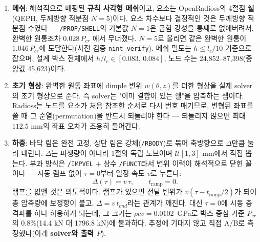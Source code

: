 \documentclass[11pt]{article}
\begin{document}
\begin{enumerate}
      한 가지는 분명히 해둔다: \textbf{항복 곡면이 없다}(\texttt{/MAT/ELAST}).
      설계 박스에서 고전 좌굴응력 $\sigma_{cr} = 0.60523\,Et/R$은
      $0.64$--$2.54$~GPa이므로, 실제 강재라면 좌굴하기 훨씬 전에 항복한다.
      즉 이 벤치마크는 "강재로 만든 캔"의 모델이 아니라 \emph{탄성 박막쉘
      모델문제}이고, 강재의 $E$와 $\rho$는 그 모델문제에 물리 단위를 주기 위한
      선택이다. 이는 고전 좌굴이론과 knockdown factor 문헌(NASA~SP-8007 등)이
      다루는 대상과 정확히 같은 설정이므로, 보고하는 $P_{\max}/P_{cr}$은 그
      문헌과 직접 비교 가능하다. 소성까지 포함한 좌굴은 별도의 문제이며 이
      데이터셋의 범위가 아니다.
\item \textbf{메쉬}: 해석적으로 매핑된 \textbf{규칙 사각형 메쉬}이고, 요소는
      OpenRadioss의 4절점 쉘(QEPH, 두께방향 적분점 $N{=}5$)이다. 요소 차수보다
      결정적인 것은 두께방향 적분점 수였다 --- \texttt{/PROP/SHELL}의 기본값
      $N{=}1$은 굽힘 강성을 통째로 없애버려서, 완벽한 원통조차 $0.028\,P_{cr}$
      에서 무너졌다. $N{=}5$로 올리면 같은 완벽한 원통이 $1.046\,P_{cr}$에
      도달한다(사전 검증 \texttt{nint\_verify}). 메쉬 밀도는 $h \le l_c/10$
      기준으로 잡으며, 설계 박스 전체에서 $h/l_c \in [0.083,\,0.084]$,
      노드 수는 24{,}852--87{,}398(중앙값 45{,}623)이다.
\item \textbf{초기 형상}: 완벽한 원통 좌표에 dimple 변위 $w(\theta,z)$를 더한
      형상을 실제 solver의 초기 형상으로 준다. 즉 solver는 "이미 결함이 있는
      쉘"을 압축하는 셈이다. Radioss는 노드를 요소가 처음 참조한 순서로 다시
      번호 매기므로, 변형된 좌표를 쓸 때 그 순열(permutation)을 반드시 되돌려야
      한다 --- 되돌리지 않으면 최대 $112.5$ mm의 좌표 오차가 조용히 들어간다.
\item \textbf{하중}: 바닥 림은 완전 고정, 상단 림은 강체(\texttt{/RBODY})로 묶어
      축방향으로 $\Delta$만큼 눌러 내린다. $\Delta$는 파생량이 아니라 1절의
      독립 노브이며 $\mathcal{U}[1,3]$ mm에서 직접 뽑는다. 부과 방식은
      \texttt{/IMPVEL} + 상수 \texttt{/FUNCT}라서 변위 이력이 해석적으로
      닫힌 꼴이다 --- 시동 램프 없이 $\tau{=}0$부터 일정 속도 $v$로 누른다:
      \[
        \Delta(\tau) = v\,\tau,
        \qquad t_\mathrm{ramp} = 0.
      \]
      램프를 없앤 것은 의도적이다. 램프가 있으면 전달 변위가
      $v(\tau - t_\mathrm{ramp}/2)$가 되어 총 압축량에 보정항이 붙고,
      $\Delta = v\,t_{end}$라는 관계가 깨진다. 대신 $\tau{=}0$에 시동
      충격파를 하나 허용하게 되는데, 그 크기는 $\rho c v = 0.0102$~GPa로
      박스 중심 기준 $P_{cr}$의 0.8\%(14.4 kN 대 1796.8 kN)에 불과하다.
      추정에 기대지 않고 직접 A/B로 측정했다(아래 \textbf{solver와 출력 $P$}).


\end{enumerate}
\end{document}
